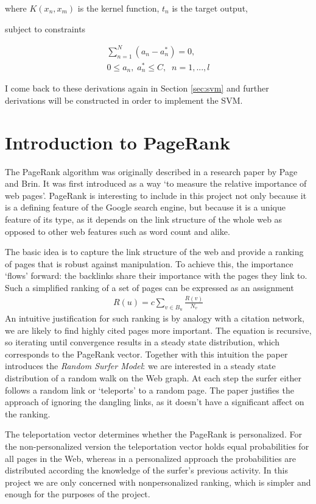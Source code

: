 \documentclass[12pt,notitlepage,twoside]{scrreprt}
\begin{document}
where \(K(x_n,x_m) \) is the kernel function, \(t_n\) is the target output,

subject to constraints

\begin{gather}
  \sum_{n=1}^{N}(a_n-a_n^*)=0,\\
  0\leq a_n,\; a_n^*\leq C,\;\;    n=1,...,l 
\end{gather}

I come back to these derivations again in Section \ref{sec:svm} and further derivations
will be constructed in order to implement the SVM.
\section{Introduction to PageRank}
The PageRank algorithm was originally described in a research paper
by Page and Brin\cite{PageRank}. It was first introduced as a way `to measure
the relative importance of web pages'. PageRank is interesting to include in
this project not only because it is a defining feature of the Google search
engine, but because it is a unique feature of its type, as it depends on the link
structure of the whole web as opposed to other  web features such as word count
and alike.

The basic idea is to capture the link structure of the web and provide a
ranking of pages that is robust against manipulation. To achieve this, the
importance `flows' forward: the backlinks share their importance with the pages
they link to. Such a simplified ranking of a set of pages can be expressed as an assignment
\begin{gather}
  R(u)=c\sum_{v\in B_u}\frac{R(v)}{N_v}
\end{gather}
An intuitive justification for such ranking is by analogy with a citation
network, we are likely to find highly cited pages more important.
The equation is recursive, so iterating until convergence results in a steady
state distribution, which corresponds to the PageRank vector.
Together with this intuition the paper introduces the \textit{Random Surfer
Model}: we are interested in a steady state distribution of a random walk on
the Web graph. At each step the surfer either follows a random link or
`teleports' to a random page. The paper justifies the approach of ignoring the
dangling links, as it doesn't have a significant affect on the ranking. 

The teleportation vector determines whether the PageRank is personalized. For
the non-personalized version the teleportation vector holds equal probabilities
for all pages in the Web, whereas in a personalized approach the probabilities
are distributed according the knowledge of the surfer's previous activity. In
this project we are only concerned with nonpersonalized ranking, which is simpler and
enough for the purposes of the project.
\end{document}
